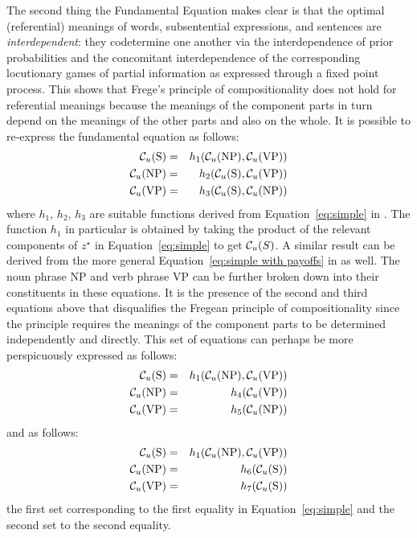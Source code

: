 The second thing the Fundamental Equation makes clear is that the optimal (referential) meanings of words, subsentential expressions, and sentences are \emph{interdependent}: they codetermine one another via the interdependence of prior probabilities and the concomitant interdependence of the corresponding locutionary games of partial information as expressed through a fixed point process. This shows that Frege's principle of compositionality does not hold for referential meanings because the meanings of the component parts in turn depend on the meanings of the other parts and also on the whole. It is possible to re-express the fundamental equation as follows:
\begin{eqnarray*}
{\cal C}_u(\hbox{S}) & = & h_1({\cal C}_u(\hbox{NP}), {\cal C}_u(\hbox{VP})) \\
{\cal C}_u(\hbox{NP}) & = & h_2({\cal C}_u(\hbox{S}), {\cal C}_u(\hbox{VP})) \\
{\cal C}_u(\hbox{VP}) & = & h_3({\cal C}_u(\hbox{S}), {\cal C}_u(\hbox{NP}))
\end{eqnarray*}
\noindent where $h_1$, $h_2$, $h_3$ are suitable functions derived from Equation~\ref{eq:simple} in . The function $h_1$ in particular is obtained by taking the product of the relevant components of $z^{\star}$ in Equation~\ref{eq:simple} to get ${\cal C}_u(S)$. A similar result can be derived from the more general Equation~\ref{eq:simple with payoffs} in  as well. The noun phrase NP and verb phrase VP can be further broken down into their constituents in these equations. It is the presence of the second and third equations above that disqualifies the Fregean principle of compositionality since the principle requires the meanings of the component parts to be determined independently and directly. This set of equations can perhaps be more perspicuously expressed as follows:
\begin{eqnarray*}
{\cal C}_u(\hbox{S}) & = & h_1({\cal C}_u(\hbox{NP}), {\cal C}_u(\hbox{VP})) \\
{\cal C}_u(\hbox{NP}) & = & h_4({\cal C}_u(\hbox{VP})) \\
{\cal C}_u(\hbox{VP}) & = & h_5({\cal C}_u(\hbox{NP}))
\end{eqnarray*}
\noindent and as follows:
\begin{eqnarray*}
{\cal C}_u(\hbox{S}) & = & h_1({\cal C}_u(\hbox{NP}), {\cal C}_u(\hbox{VP})) \\
{\cal C}_u(\hbox{NP}) & = & h_6({\cal C}_u(\hbox{S})) \\
{\cal C}_u(\hbox{VP}) & = & h_7({\cal C}_u(\hbox{S}))
\end{eqnarray*}
\noindent the first set corresponding to the first equality in Equation~\ref{eq:simple} and the second set to the second equality.

